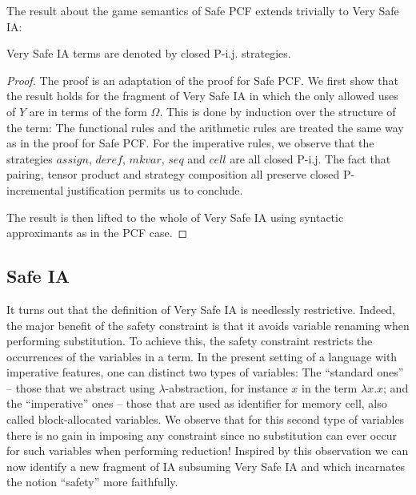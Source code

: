 The result about the game semantics of Safe PCF extends trivially to
Very Safe IA:
\begin{proposition}
  Very Safe IA terms are denoted by closed P-i.j. strategies.
\end{proposition}
\begin{proof}
The proof is an adaptation of the proof for Safe PCF. We first show that the result holds for the
fragment of Very Safe IA in which the only allowed uses of $Y$ are in terms of the form $\Omega$.
This is done by induction over the structure of the term:
The functional rules and the arithmetic rules are treated
the same way as in the proof for Safe PCF. For the imperative rules, we
observe that the strategies $assign$, $deref$, $mkvar$, $seq$ and
$cell$ are all closed P-i.j. The fact that pairing, tensor product
and strategy composition all preserve closed P-incremental
justification permits us to conclude.

The result is then lifted to the whole of Very Safe IA using syntactic approximants as in the PCF case.
\end{proof}


\subsection{Safe IA}

It turns out that the definition of Very Safe IA is needlessly
restrictive. Indeed, the major benefit of the safety constraint is
that it avoids variable renaming when performing substitution. To
achieve this, the safety constraint restricts the occurrences of the
variables in a term. In the present setting of a language with
imperative features, one can distinct two types of variables: The
``standard ones'' -- those that we abstract using
$\lambda$-abstraction, for instance $x$ in the term $\lambda x . x$;
and the ``imperative'' ones -- those that are used as identifier for
memory cell, also called block-allocated variables. We observe that
for this second type of variables there is no gain in imposing any
constraint since no substitution can ever occur for such variables
when performing reduction! Inspired by this observation we can now identify a new fragment of IA subsuming Very Safe IA and which incarnates the notion ``safety''
 more faithfully.

